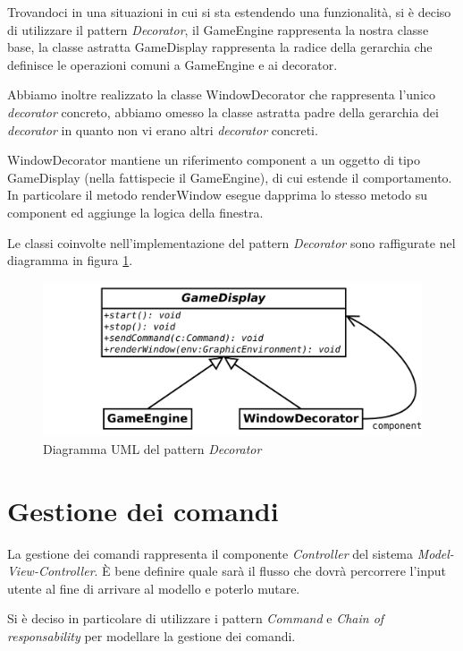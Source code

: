 \documentclass[a4paper,12pt]{article}
\begin{document}
Trovandoci in una situazioni in cui si sta estendendo una funzionalit\`a, si \`e deciso di utilizzare il pattern \emph{Decorator}, il \textsf{GameEngine} rappresenta la nostra classe base, la classe astratta \textsf{GameDisplay} rappresenta la radice della gerarchia che definisce le operazioni comuni a \textsf{GameEngine} e ai decorator.

Abbiamo inoltre realizzato la classe \textsf{WindowDecorator} che rappresenta l'unico \textit{decorator} concreto, abbiamo omesso la classe astratta padre della gerarchia dei \emph{decorator} in quanto non vi erano altri \emph{decorator} concreti.

\textsf{WindowDecorator} mantiene un riferimento \textsf{component} a un oggetto di tipo \textsf{GameDisplay} (nella fattispecie il \textsf{GameEngine}), di cui estende il comportamento. In particolare il metodo \textsf{renderWindow} esegue dapprima lo stesso metodo su \textsf{component} ed aggiunge la logica della finestra.

Le classi coinvolte nell'implementazione del pattern \emph{Decorator} sono raffigurate nel diagramma in figura \ref{img:Decorator}.

\begin{figure}[h]
\centering
\includegraphics[width=12cm]{Decorator.pdf}
\caption{Diagramma UML del pattern \emph{Decorator}}
\label{img:Decorator}
\end{figure}

\section{Gestione dei comandi}
\label{sec:comandi}

La gestione dei comandi rappresenta il componente \emph{Controller} del sistema \emph{Model-View-Controller}. \`E bene definire quale sar\`a il flusso che dovr\`a percorrere l'input utente al fine di arrivare al modello e poterlo mutare.

Si \`e deciso in particolare di utilizzare i pattern \emph{Command} e \emph{Chain of responsability} per modellare la gestione dei comandi.
\end{document}
